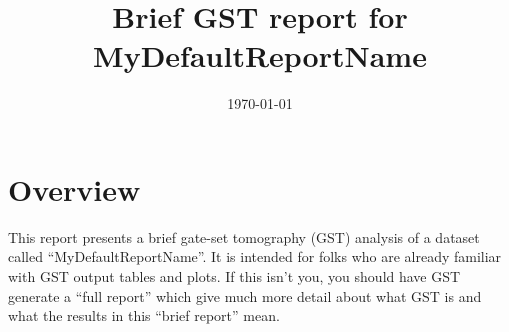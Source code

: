 \documentclass{article}[11pt]
\begin{document}
\title{Brief GST report for MyDefaultReportName}
\date{\vspace{-1cm}\today}

\begingroup
\let\center\flushleft
\let\endcenter\endflushleft
\maketitle
\endgroup

\section{Overview}
This report presents a brief gate-set tomography (GST) analysis of a dataset called ``MyDefaultReportName''.   It is intended for folks who are already familiar with GST output tables and plots.  If this isn't you, you should have GST generate a ``full report'' which give much more detail about what GST is and what the results in this ``brief report'' mean.
\end{document}
